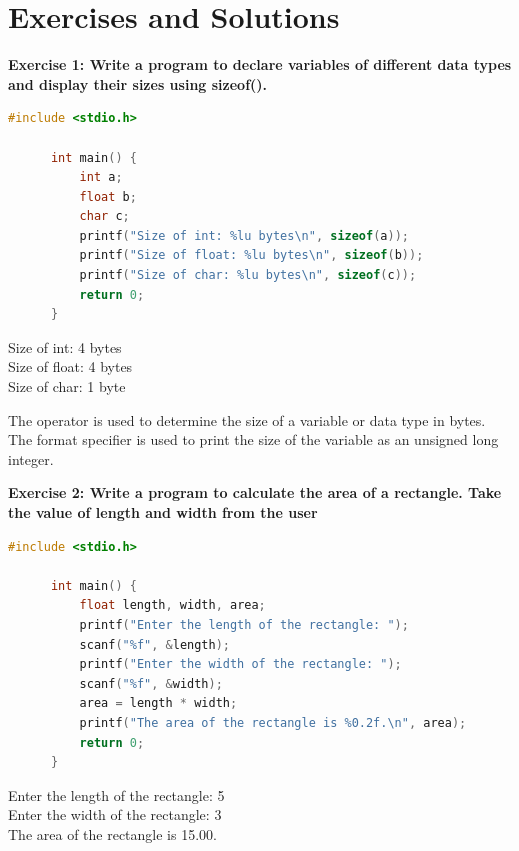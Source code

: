 \documentclass[12pt, openany]{book}
\begin{document}
  \section{Exercises and Solutions}
  \textbf{Exercise 1: Write a program to declare variables of different data types and display their sizes using sizeof().}
  
  \begin{lstlisting}[language=C, caption=Solution to Exercise 1]
      #include <stdio.h>
      
      int main() {
          int a;
          float b;
          char c;
          printf("Size of int: %lu bytes\n", sizeof(a));
          printf("Size of float: %lu bytes\n", sizeof(b));
          printf("Size of char: %lu bytes\n", sizeof(c));
          return 0;
      }
  \end{lstlisting}
  \begin{tcolorbox}[colback=lightgray!10, colframe=black, title=Output]
      Size of int: 4 bytes \\
      Size of float: 4 bytes \\
      Size of char: 1 byte
  \end{tcolorbox}
  \begin{infobox}
  The  operator is used to determine the size of a variable or data type in bytes. The  format specifier is used to print the size of the variable as an unsigned long integer.
  \end{infobox}
  
  \vspace{10pt}
  \clearpage
  \noindent\textbf{Exercise 2: Write a program to calculate the area of a rectangle. Take the value of length and width from the user}
  
  \begin{lstlisting}[language=C, caption=Solution to Exercise 2]
      #include <stdio.h>
      
      int main() {
          float length, width, area;
          printf("Enter the length of the rectangle: ");
          scanf("%f", &length);
          printf("Enter the width of the rectangle: ");
          scanf("%f", &width);
          area = length * width;
          printf("The area of the rectangle is %0.2f.\n", area);
          return 0;
      }
  \end{lstlisting}
  \begin{tcolorbox}[colback=lightgray!10, colframe=black, title=Output]
      Enter the length of the rectangle: 5 \\
      Enter the width of the rectangle: 3 \\
      The area of the rectangle is 15.00.
  \end{tcolorbox}
  
\end{document}
